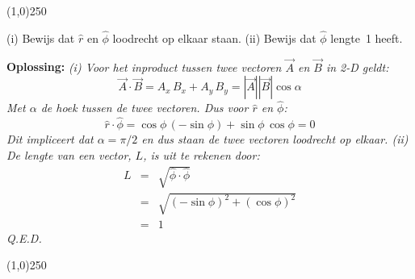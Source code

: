 \begin{center}
\line(1,0){250}
\end{center}
\begin{voorbeeld} 
(i) Bewijs dat $\hat{r}$ en $\hat{\phi}$ loodrecht op elkaar staan. (ii) Bewijs dat $\hat{\phi}$ lengte~1
heeft.

{\bf Oplossing: }{\it (i) Voor het inproduct tussen twee vectoren $\vec{A}$ en $\vec{B}$ in 2-D geldt:
\begin{equation}
\vec{A}\cdot\vec{B} = A_x\,B_x+A_y\,B_y = |\vec{A}||\vec{B}|\cos\alpha
\end{equation}
Met $\alpha$ de hoek tussen de twee vectoren. Dus voor $\hat{r}$ en $\hat{\phi}$:
\begin{equation}
\hat{r}\cdot\hat{\phi} = \cos\phi\,(-\sin\phi)+\sin\phi \,\cos\phi = 0
\end{equation}
Dit impliceert dat $\alpha=\pi/2$ en dus staan de twee vectoren loodrecht op elkaar.
(ii) De lengte van een vector, $L$, is uit te rekenen door:
\begin{eqnarray}
L & = & \sqrt{\hat{\phi}\cdot\hat{\phi}} \\
& = & \sqrt{(-\sin\phi)^2+(\cos\phi)^2} \\
& = & 1
\end{eqnarray}
Q.E.D.
}
\end{voorbeeld}
\begin{center}
\line(1,0){250}
\end{center}

